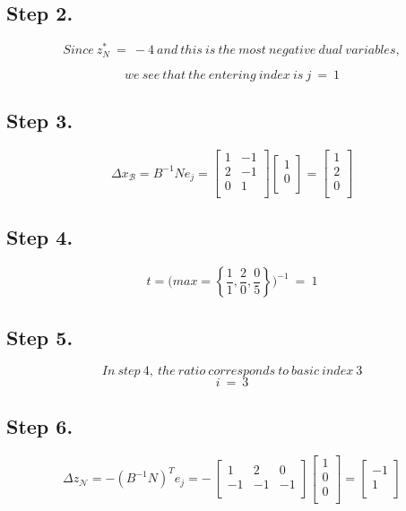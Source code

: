 \documentclass [12pt] {article}
\begin{document}
\subsection{Step 2.}
\[
Since\ z_\mathit{N}^*\ = \ -4\ and\ this\ is\ the\ most\ negative\ dual\ variables,
\]

\[
we\ see\ that\ the\ entering\ index\ is\  j\ =\ 1
\]


\subsection{Step 3.}

\[
\Delta x_{\mathcal B} = B^{-1} N e_j =
\begin{bmatrix}
1 & -1 \\
2 & -1 \\
0 & 1 \\
\end{bmatrix}
\begin{bmatrix}
1 \\
0\\
\end{bmatrix}
= \begin{bmatrix}
1 \\
2 \\
0\\
\end{bmatrix}
\]
\subsection{Step 4.}
\[
t =\Bigg(
max= \left\{\frac{1}{1},\frac{2}{0},\frac{0}{5}\right\}
\Bigg)^{-1}\ =\ 1
\]
\subsection{Step 5.}
\[
In\ step\ 4, \ the\ ratio\ corresponds\ to\ basic\ index\ 3
\]
\[
i\ = \ 3
\]
\subsection{Step 6.}
\[
\Delta z_{\mathcal N}= -( B^{-1} N )^{T}e_j = -\
\begin{bmatrix}
1 & 2 & 0 \\
-1 & -1 & -1 \\
\end{bmatrix}
\begin{bmatrix}
1 \\
0\\
0\\
\end{bmatrix}
= \begin{bmatrix}
-1 \\
1 \\
\end{bmatrix}
\]
\end{document}
